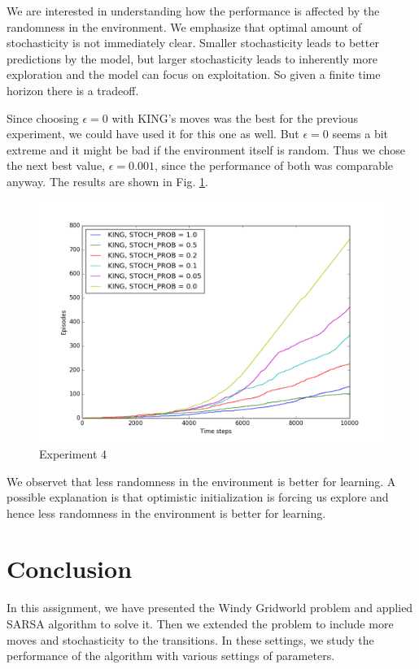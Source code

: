 \documentclass{article}
\begin{document}
    We are interested in understanding how the performance is affected by the randomness in the environment. We emphasize that optimal amount of stochasticity is not immediately clear. Smaller stochasticity leads to better predictions by the model, but larger stochasticity leads to inherently more exploration and the model can focus on exploitation. So given a finite time horizon there is a tradeoff.
    
    Since choosing $\epsilon=0$ with KING's moves was the best for the previous experiment, we could have used it for this one as well. But $\epsilon=0$ seems a bit extreme and it might be bad if the environment itself is random. Thus we chose the next best value, $\epsilon=0.001$, since the performance of both was comparable anyway. The results are shown in Fig. \ref{fig:expt4}. 
    
    \begin{figure}[!h]
        \centering
        \includegraphics[width=\textwidth]{expt4}
        \caption{Experiment 4}
        \label{fig:expt4}
    \end{figure}
    
    We observet that less randomness in the environment is better for learning. A possible explanation is that optimistic initialization is forcing us explore and hence less randomness in the environment is better for learning.

\section{Conclusion}
In this assignment, we have presented the Windy Gridworld problem and applied SARSA algorithm to solve it. Then we extended the problem to include more moves and stochasticity to the transitions. In these settings, we study the performance of the algorithm with various settings of parameters.
\end{document}
